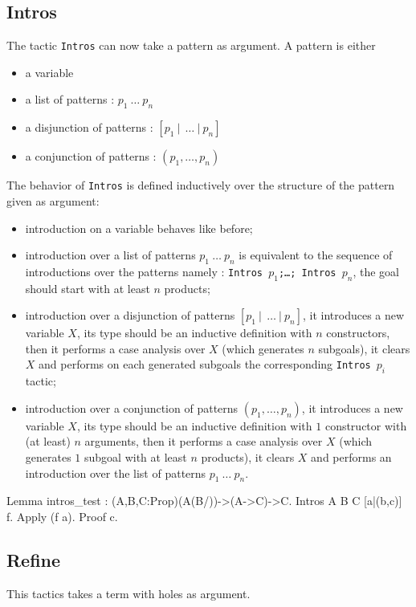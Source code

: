 \documentclass[11pt]{article}
\begin{document}
\subsection{Intros}\label{intros}
The tactic \texttt{Intros} can now take a pattern as argument. A
pattern is either 
\begin{itemize}
\item a variable
\item a list of patterns : $p_1~\ldots~p_n$
\item a disjunction of patterns : $[p_1~|~~\ldots~|~p_n]$
\item a conjunction of patterns : $(p_1,\ldots,p_n)$
\end{itemize}

The behavior of \texttt{Intros} is defined inductively over the
structure of the pattern given as argument:
\begin{itemize}
\item introduction on a variable behaves like before; 
\item introduction over a
list of patterns $p_1~\ldots~p_n$ is equivalent to the sequence of
introductions over the patterns namely :
\texttt{Intros $p_1$;\ldots; Intros $p_n$}, the goal should start with
at least $n$ products;
\item introduction over a
disjunction of patterns $[p_1~|~~\ldots~|~p_n]$, it 
introduces a new variable $X$, its type should be an inductive definition with $n$
constructors, then it performs a case analysis over $X$ 
(which generates $n$ subgoals), it 
clears $X$ and performs on each generated subgoals the corresponding
\texttt{Intros}~$p_i$ tactic;
\item introduction over a 
conjunction  of patterns $(p_1,\ldots,p_n)$, it
introduces a new variable $X$, its type should be an inductive definition with $1$
constructor with (at least) $n$ arguments, then it performs a case analysis over $X$ 
(which generates $1$ subgoal with at least $n$ products), it 
clears $X$ and performs an introduction over the list of patterns $p_1~\ldots~p_n$.
\end{itemize}
\begin{coq_example}
Lemma intros_test : (A,B,C:Prop)(A\/(B/\C))->(A->C)->C.
Intros A B C [a|(b,c)] f.
Apply (f a).
Proof c.
\end{coq_example}
\subsection{Refine}\label{refine}
This tactics takes a term with holes as argument.
\end{document}
